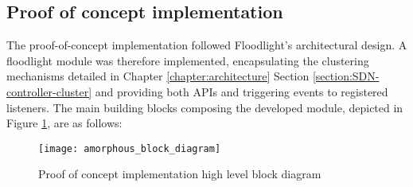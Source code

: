 \subsection{Proof of concept implementation}
\label{subsection:poc-module}
%
The proof-of-concept implementation followed Floodlight's architectural design.
A floodlight module was therefore implemented, encapsulating the clustering mechanisms detailed in Chapter \ref*{chapter:architecture} Section \ref{section:SDN-controller-cluster} and providing both \glspl{API} and triggering events to registered listeners.
The main building blocks composing the developed module, depicted in Figure \ref{fig:amorphous_block_diagram}, are as follows:
%
\begin{figure}
	\centering
	\texttt{[image: amorphous\_block\_diagram]}
	\caption{Proof of concept implementation high level block diagram}
	\label{fig:amorphous_block_diagram}
\end{figure}
%
